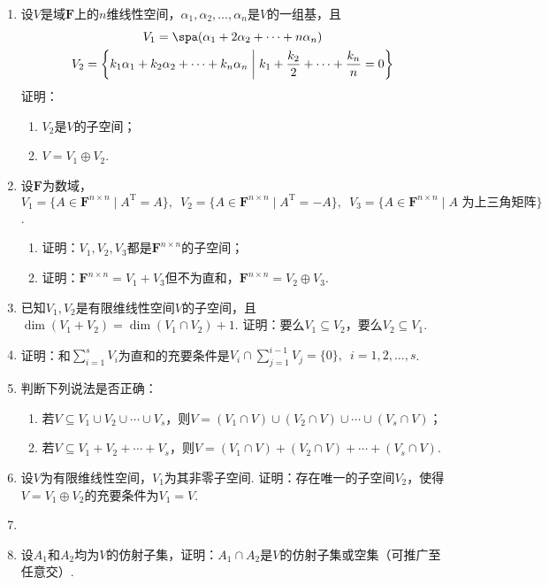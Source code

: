 \begin{enumerate}
    \item 设$V$是域$\mathbf{F}$上的$n$维线性空间，$\alpha_1,\alpha_2,\ldots,\alpha_n$是$V$的一组基，且
          \begin{gather*}
              V_1=\spa(\alpha_1+2\alpha_2+\cdots+n\alpha_n) \\
              V_2=\left\{k_1\alpha_1+k_2\alpha_2+\cdots+k_n\alpha_n \;\middle|\; k_1+\dfrac{k_2}{2}+\cdots+\dfrac{k_n}{n}=0\right\}
          \end{gather*}
          证明：
          \begin{enumerate}
              \item $V_2$是$V$的子空间；

              \item $V=V_1\oplus V_2$.
          \end{enumerate}

    \item 设$\mathbf{F}$为数域，$V_1=\{A\in\mathbf{F}^{n\times n} \mid A^\mathrm{T}=A\},\enspace
              V_2=\{A\in\mathbf{F}^{n\times n} \mid A^\mathrm{T}=-A\},\enspace V_3=\{A\in\mathbf{F}^{n\times n} \mid A\text{~为上三角矩阵}\}$.
          \begin{enumerate}
              \item 证明：$V_1,V_2,V_3$都是$\mathbf{F}^{n\times n}$的子空间；

              \item 证明：$\mathbf{F}^{n\times n}=V_1+V_3$但不为直和，$\mathbf{F}^{n\times n}=V_2\oplus V_3$.
          \end{enumerate}

    \item 已知$V_1,V_2$是有限维线性空间$V$的子空间，且$\dim(V_1+V_2)=\dim(V_1 \cap V_2)+1$. 证明：要么$V_1 \subseteq V_2$，要么$V_2 \subseteq V_1$.

    \item 证明：和$\sum\limits_{i=1}^{s}V_i$为直和的充要条件是$V_i \cap \sum\limits_{j=1}^{i-1}V_j=\{0\},\enspace i=1,2,\ldots,s$.

    \item 判断下列说法是否正确：
          \begin{enumerate}
              \item 若$V \subseteq V_1 \cup V_2 \cup \cdots \cup V_s$，则$V=(V_1 \cap V)\cup(V_2 \cap V)\cup\cdots\cup(V_s \cap V)$；

              \item 若$V \subseteq V_1+V_2+\cdots +V_s$，则$V=(V_1 \cap V)+(V_2 \cap V)+\cdots+(V_s \cap V)$.
          \end{enumerate}

    \item 设$V$为有限维线性空间，$V_1$为其非零子空间. 证明：存在唯一的子空间$V_2$，使得$V=V_1\oplus V_2$的充要条件为$V_1=V$.

    \item \item 设$A_1$和$A_2$均为$V$的仿射子集，证明：$A_1\cap A_2$是$V$的仿射子集或空集（可推广至任意交）.
\end{enumerate}

